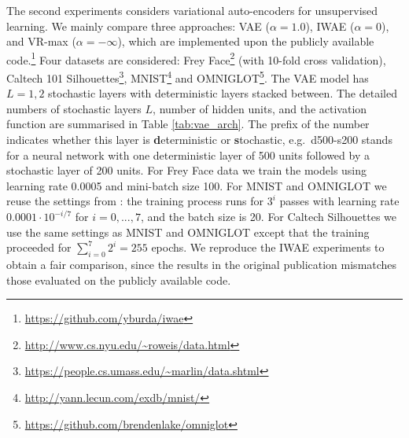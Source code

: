 The second experiments considers variational auto-encoders for unsupervised learning. We mainly compare three approaches: VAE ($\alpha = 1.0$), IWAE ($\alpha = 0$), and VR-max ($\alpha = -\infty$), which are implemented upon the publicly available code.\footnote{\url{https://github.com/yburda/iwae}}
%
Four datasets are considered: Frey Face\footnote{\url{http://www.cs.nyu.edu/~roweis/data.html}} (with 10-fold cross validation), Caltech 101 Silhouettes\footnote{\url{https://people.cs.umass.edu/~marlin/data.shtml}}, MNIST\footnote{\url{http://yann.lecun.com/exdb/mnist/}} and OMNIGLOT\footnote{\url{https://github.com/brendenlake/omniglot}}. The VAE model has $L=1, 2$ stochastic layers with deterministic layers stacked between.  The detailed numbers of stochastic layers $L$, number of hidden units, and the activation function are summarised in Table \ref{tab:vae_arch}. The prefix of the number indicates whether this layer is \textbf{d}eterministic or \textbf{s}tochastic, e.g.~d500-s200 stands for a neural network with one deterministic layer of 500 units followed by a stochastic layer of 200 units. For Frey Face data we train the models using learning rate 0.0005 and mini-batch size 100. For MNIST and OMNIGLOT we reuse the settings from \cite{burda:iwae2016}: the training process runs for $3^i$ passes with learning rate $0.0001 \cdot 10^{-i/7}$ for $i = 0, ..., 7$, and the batch size is 20. For Caltech Silhouettes we use the same settings as MNIST and OMNIGLOT except that the training proceeded for $\sum_{i=0}^7 2^i = 255$ epochs. We reproduce the IWAE experiments to obtain a fair comparison, since the results in the original publication \citep{burda:iwae2016} mismatches those evaluated on the publicly available code.
%

%

